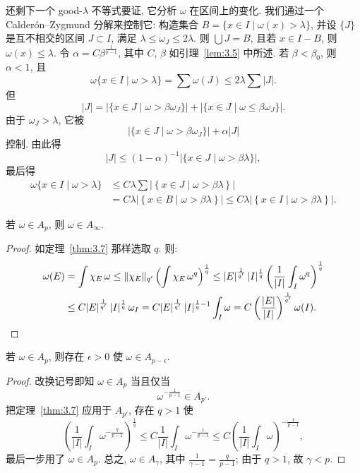 还剩下一个 good-$\lambda$ 不等式要证, 它分析 $\omega$ 在区间上的变化. 我们通过一个 Calder\'on--Zygmund 分解来控制它: 构造集合 $B=\{x\in I \mid \omega(x)>\lambda\}$, 并设 $\{J\}$ 是互不相交的区间 $J\subset I$, 满足 $\lambda\leq\omega_J\leq 2\lambda$. 则 $\bigcup J=B$, 且若 $x\in I-B$, 则 $\omega(x)\leq\lambda$. 令 $\alpha=C\beta^{\frac{1}{p-1}}$, 其中 $C$, $\beta$ 如引理~\ref{lem:3.5} 中所述. 若 $\beta<\beta_0$, 则 $\alpha<1$, 且
\[
\omega\{x\in I \mid \omega>\lambda\}=\sum\omega(J)\leq 2\lambda\sum|J|.
\]
但
\[
|J|=|\{x\in J \mid \omega>\beta\omega_{J}\}|+|\{x\in J \mid \omega\leq\beta\omega_{J}\}|.
\]
由于 $\omega_{J}>\lambda$, 它被
\[
|\{x\in J \mid \omega>\beta\omega_{J}\}|+\alpha|J|
\]
控制. 由此得
\[
|J|\leq(1-\alpha)^{-1}\left|\{x\in J \mid \omega>\beta\lambda\}\right|,
\]
最后得
\begin{align*}
\omega\{x\in I \mid \omega>\lambda\}
&\leq C\lambda\sum\left|\left\{x\in J \mid \omega>\beta\lambda\right\}\right| \\
&=C\lambda\left|\left\{x\in B \mid \omega>\beta\lambda\right\}\right|
\leq C\lambda\left|\left\{x\in I \mid \omega>\beta\lambda\right\}\right|.
\end{align*}

\begin{corollary}\label{cor:3.8}
若 $\omega\in A_p$, 则 $\omega\in A_\infty$.
\end{corollary}

\begin{proof}
如定理~\ref{thm:3.7} 那样选取 $q$. 则:
\begin{align*}
\omega(E)&=\int\chi_{E}\,\omega\leq\|\chi_{E}\|_{q'}\,\Bigl(\int\chi_{E}\,\omega^{q}\Bigr)^{\frac{1}{q}}
\leq|E|^{\frac{1}{q'}}\,|I|^{\frac{1}{q}}\left(\frac{1}{|I|}\int_{I}\omega^{q}\right)^{\frac{1}{q}} \\
&\leq C|E|^{\frac{1}{q'}}\,|I|^{\frac{1}{q}}\,\omega_{I}
=C|E|^{\frac{1}{q'}}\,|I|^{\frac{1}{q}-1}\int_{I}\omega
=C\left(\frac{|E|}{|I|}\right)^{\frac{1}{q'}}\omega(I). \qedhere
\end{align*}
\end{proof}

\begin{corollary}\label{cor:3.9}
若 $\omega\in A_p$, 则存在 $\epsilon>0$ 使 $\omega\in A_{p-\epsilon}$.
\end{corollary}

\begin{proof}
改换记号即知 $\omega\in A_p$ 当且仅当
\[
\omega^{-\frac{1}{p-1}}\in A_{p'}.
\]
把定理~\ref{thm:3.7} 应用于 $A_{p'}$, 存在 $q>1$ 使
\[
\left(\frac{1}{|I|}\int_{I}\omega^{-\frac{q}{p-1}}\right)^{\frac{1}{q}}
\leq C\frac{1}{|I|}\int_{I}\omega^{-\frac{1}{p-1}}
\leq C\left(\frac{1}{|I|}\int_{I}\omega\right)^{-\frac{1}{p-1}},
\]
最后一步用了 $\omega\in A_p$. 总之, $\omega\in A_\gamma$, 其中 $\frac{1}{\gamma-1}=\frac{q}{p-1}$; 由于 $q>1$, 故 $\gamma<p$.
\end{proof}


